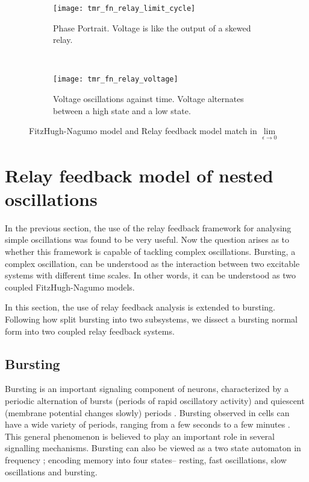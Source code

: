\documentclass[a4paper, 12pt]{article}
\begin{document}
\begin{figure}[h!]
    \centering
    \begin{subfigure}[t]{0.45\textwidth}
        \texttt{[image: tmr\_fn\_relay\_limit\_cycle]}
        \caption{Phase Portrait. Voltage is like the output of a skewed relay.}
        \label{fig:f_n_relay_limit_cycle}
    \end{subfigure}
    ~ %
    \begin{subfigure}[t]{0.45\textwidth}
        \texttt{[image: tmr\_fn\_relay\_voltage]}
        \caption{Voltage oscillations against time. Voltage alternates between a high state and a low state.}
        \label{fig:f_n_relay_voltage}
    \end{subfigure}
\caption{FitzHugh-Nagumo model and Relay feedback model match in $\lim\limits_{\epsilon\to 0}$}
\label{fig:matching_fitz_relay}
\end{figure}

\FloatBarrier


\section{Relay feedback model of nested oscillations}\label{Sec:nested oscillations}
In the previous section, the use of the relay feedback framework for analysing simple oscillations was found to be very useful. Now the question arises as to whether this framework is capable of tackling complex oscillations. Bursting, a complex oscillation, can be understood as the interaction between two excitable systems with different time scales\cite{drion}. In other words, it can be understood as two coupled FitzHugh-Nagumo models. 

In this section, the use of relay feedback analysis is extended to bursting. Following how \cite{rinzel} split bursting into two subsystems, we dissect a bursting normal form into two coupled relay feedback systems. 

\subsection{Bursting}
Bursting is an important signaling component of neurons, characterized by a periodic alternation of bursts (periods of rapid oscillatory activity) and quiescent (membrane potential changes slowly) periods \cite{franci2}. Bursting observed in cells can have a wide variety of periods, ranging from a few seconds to a few minutes \cite{keener}. This general phenomenon is believed to play an important role in several signalling mechanisms. Bursting can also be viewed as a two state automaton in frequency \cite{drion}; encoding memory into four states-- resting, fast oscillations, slow oscillations and bursting. 
\end{document}
